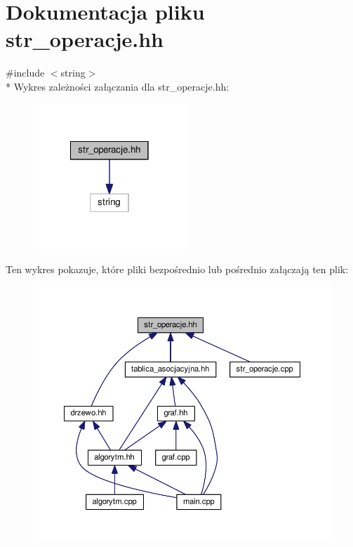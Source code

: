 \hypertarget{str__operacje_8hh}{\section{Dokumentacja pliku str\-\_\-operacje.\-hh}
\label{str__operacje_8hh}
}
{\ttfamily \#include $<$string$>$}\\*
Wykres zależności załączania dla str\-\_\-operacje.\-hh\-:\nopagebreak
\begin{figure}[H]
\begin{center}
\leavevmode
\includegraphics[width=162pt]{str__operacje_8hh__incl}
\end{center}
\end{figure}
Ten wykres pokazuje, które pliki bezpośrednio lub pośrednio załączają ten plik\-:\nopagebreak
\begin{figure}[H]
\begin{center}
\leavevmode
\includegraphics[width=350pt]{str__operacje_8hh__dep__incl}
\end{center}
\end{figure}
